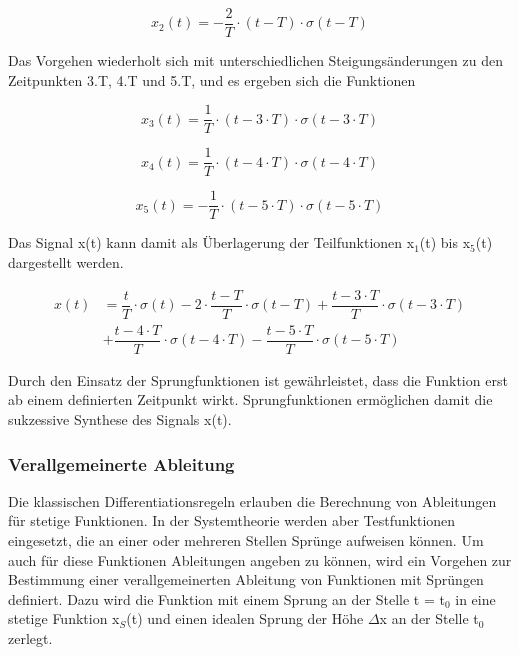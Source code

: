 \begin{equation}\label{eq:onefiftythree}
x_{2} \left(t\right)=-\dfrac{2}{T} \cdot \left(t-T\right)\cdot \sigma \left(t-T\right)
\end{equation}

\noindent Das Vorgehen wiederholt sich mit unterschiedlichen Steigungs\"{a}nderungen zu den Zeitpunkten 3$.$T, 4$.$T und 5$.$T, und es ergeben sich die Funktionen 

\begin{equation}\label{eq:onefiftyfour}
x_{3} \left(t\right)=\dfrac{1}{T} \cdot \left(t-3\cdot T\right)\cdot \sigma \left(t-3\cdot T\right)
\end{equation}

\begin{equation}\label{eq:onefiftyfive}
x_{4} \left(t\right)=\dfrac{1}{T} \cdot \left(t-4\cdot T\right)\cdot \sigma \left(t-4\cdot T\right)
\end{equation}


\begin{equation}\label{eq:onefiftysix}
x_{5} \left(t\right)=-\dfrac{1}{T} \cdot \left(t-5\cdot T\right)\cdot \sigma \left(t-5\cdot T\right)
\end{equation}

\noindent Das Signal x(t) kann damit als \"{U}berlagerung der Teilfunktionen x${}_{1}$(t) bis x${}_{5}$(t) dargestellt werden.


\begin{equation}\label{eq:onefiftyseven}
\begin{split}
x(t) & = \dfrac{t}{T} \cdot \sigma \left(t\right)-2\cdot \dfrac{t-T}{T} \cdot \sigma \left(t-T\right)+\dfrac{t-3\cdot T}{T} \cdot \sigma \left(t-3\cdot T\right) \\
 & +\dfrac{t-4\cdot T}{T} \cdot \sigma \left(t-4\cdot T\right)-\dfrac{t-5\cdot T}{T} \cdot \sigma \left(t-5\cdot T\right)
\end{split}
\end{equation}


\noindent Durch den Einsatz der Sprungfunktionen ist gew\"{a}hrleistet, dass die Funktion erst ab einem definierten Zeitpunkt wirkt. Sprungfunktionen erm\"{o}glichen damit die sukzessive Synthese des Signals x(t). 


\subsubsection{ Verallgemeinerte Ableitung}

\noindent Die klassischen Differentiationsregeln erlauben die Berechnung von Ableitungen f\"{u}r stetige Funktionen. In der Systemtheorie werden aber Testfunktionen eingesetzt, die an einer oder mehreren Stellen Spr\"{u}nge aufweisen k\"{o}nnen. Um auch f\"{u}r diese Funktionen Ableitungen angeben zu k\"{o}nnen, wird ein Vorgehen zur Bestimmung einer verallgemeinerten Ableitung von Funktionen mit Spr\"{u}ngen definiert. Dazu wird die Funktion mit einem Sprung an der Stelle t = t${}_{0}$ in eine stetige Funktion x${}_{S}$(t) und einen idealen Sprung der H\"{o}he $\Delta$x an der Stelle t${}_{0}$ zerlegt.

